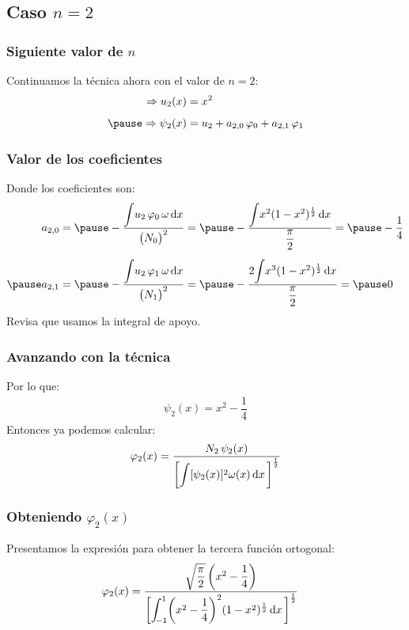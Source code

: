 \documentclass[12pt]{beamer}
\begin{document}
\subsection{Caso \texorpdfstring{$n = 2$}{n = 2}}

\begin{frame}
\frametitle{Siguiente valor de $n$}
Continuamos la técnica ahora con el valor de $n = 2$:
\pause
\begin{eqnarray*}
\begin{aligned}
\Rightarrow u_{2} (x) &= x^{2} \\[0.5em] \pause
\Rightarrow \psi_{2} (x) &=  u_{2} + a_{2,0} \, \varphi_{0} + a_{2,1} \, \varphi_{1}
\end{aligned}
\end{eqnarray*}    
\end{frame}
\begin{frame}
\frametitle{Valor de los coeficientes}
Donde los coeficientes son:
\pause
\begin{eqnarray*}
\begin{aligned}    
a_{2,0} &= \pause - \dfrac{\scaleint{5ex} u_{2} \, \varphi_{0} \, \omega \dd{x}}{\big( N_{0} \big)^{2}} = \pause - \dfrac{\scaleint{5ex} x^{2} (1 - x^{2})^{\frac{1}{2}} \dd{x}}{\dfrac{\pi}{2}} = \pause - \dfrac{1}{4} \\[0.5em] \pause
a_{2,1} &= \pause - \dfrac{\scaleint{5ex} u_{2} \, \varphi_{1} \, \omega \dd{x}}{\big( N_{1} \big)^{2}} = \pause
- \dfrac{2 \scaleint{5ex} x^{3} (1 - x^{2})^{\frac{1}{2}} \dd{x}}{\dfrac{\pi}{2}} = \pause 0
\end{aligned}
\end{eqnarray*}
Revisa que usamos la integral de apoyo.
\end{frame}
\begin{frame}
\frametitle{Avanzando con la técnica}
Por lo que:
\pause
\begin{align*}
\psi_{2}(x) = x^{2} - \dfrac{1}{4}
\end{align*}
\pause
Entonces ya podemos calcular:
\pause
\begin{align*}
\varphi_{2}(x) = \dfrac{N_{2} \, \psi_{2} (x)}{ \bigg[ \scaleint{5ex} [\psi_{2} (x)]^{2} \omega (x) \dd{x} \bigg]^{\frac{1}{2}}}
\end{align*}
\end{frame}
\begin{frame}
\frametitle{Obteniendo $\varphi_{2}(x)$}
Presentamos la expresión para obtener la tercera función ortogonal:
\pause
\begin{eqnarray*}
\begin{aligned}
\varphi_{2}(x) &= \dfrac{\sqrt{\dfrac{\pi}{2}} \, \bigg( x^{2} - \dfrac{1}{4} \bigg)}{ \bigg[ \scaleint{5ex}_{\bs -1}^{1} \bigg( x^{2} - \dfrac{1}{4} \bigg)^{2} (1 -x^{2})^{\frac{1}{2}} \dd{x} \bigg]^{\frac{1}{2}}}
\end{aligned}
\end{eqnarray*}
\end{frame}
\end{document}
